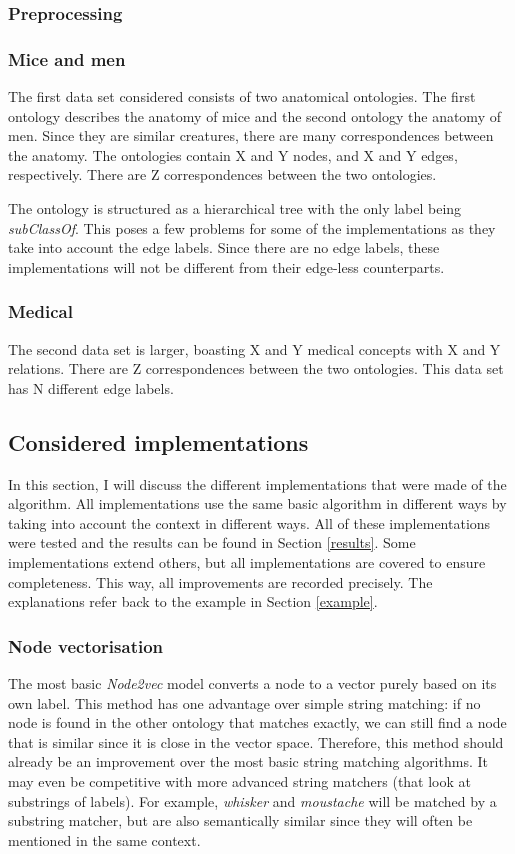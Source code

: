 \documentclass{article}
\begin{document}
 \subsubsection{Preprocessing} \label{preprocessing}

 \subsubsection{Mice and men}
 The first data set considered consists of two anatomical ontologies. The first ontology describes the anatomy of mice and the second ontology the anatomy of men. Since they are similar creatures, there are many correspondences between the anatomy. The ontologies contain X and Y nodes, and X and Y edges, respectively. There are Z correspondences between the two ontologies.
 
 The ontology is structured as a hierarchical tree with the only label being \emph{subClassOf}. This poses a few problems for some of the implementations as they take into account the edge labels. Since there are no edge labels, these implementations will not be different from their edge-less counterparts.
 \subsubsection{Medical}
 The second data set is larger, boasting X and Y medical concepts with X and Y relations. There are Z correspondences between the two ontologies. This data set has N different edge labels.
 
 \subsection{Considered implementations}
 In this section, I will discuss the different implementations that were made of the algorithm. All implementations use the same basic algorithm in different ways by taking into account the context in different ways. All of these implementations were tested and the results can be found in Section \ref{results}. Some implementations extend others, but all implementations are covered to ensure completeness. This way, all improvements are recorded precisely.
 The explanations refer back to the example in Section \ref{example}.
  \subsubsection{Node vectorisation}
  The most basic \emph{Node2vec} model converts a node to a vector purely based on its own label. This method has one advantage over simple string matching: if no node is found in the other ontology that matches exactly, we can still find a node that is similar since it is close in the vector space. Therefore, this method should already be an improvement over the most basic string matching algorithms. It may even be competitive with more advanced string matchers (that look at substrings of labels). For example, \emph{whisker} and \emph{moustache} will be matched by a substring matcher, but are also semantically similar since they will often be mentioned in the same context.
\end{document}
